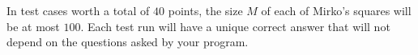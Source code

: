 In test cases worth a total of $40$ points, the size $M$ of each of Mirko's squares will be at most $100$. Each test run will have a unique correct answer that will not depend on the questions asked by your program.
